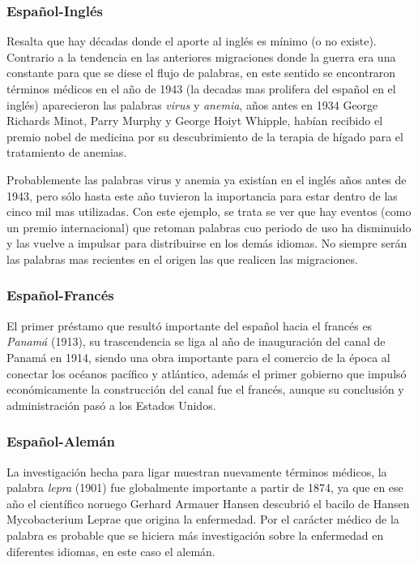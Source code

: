 \subsubsection*{Español-Inglés}%

Resalta que hay décadas donde el aporte al inglés es mínimo (o no existe). Contrario a la tendencia en las anteriores migraciones donde la guerra era una constante para que se diese el flujo de palabras, en este sentido se encontraron términos médicos en el año de 1943 (la decadas mas prolifera del español en el inglés) aparecieron las palabras \textit{virus} y \textit{anemia}, años antes en 1934 George Richards Minot, Parry Murphy y George Hoiyt Whipple, habían recibido el premio nobel de medicina por su descubrimiento de la terapia de hígado para el tratamiento de anemias.   

Probablemente las palabras virus y anemia ya existían en el inglés años antes de 1943,  pero sólo hasta este año tuvieron la importancia para estar dentro de las cinco mil mas utilizadas. Con este ejemplo, se trata se ver que hay eventos (como un premio internacional) que retoman palabras cuo periodo de uso  ha disminuido y las vuelve a impulsar para distribuirse en los demás idiomas.   No siempre serán las palabras mas recientes en el origen las que realicen las migraciones. 

\subsubsection*{Español-Francés}%

El primer préstamo que resultó importante del español hacia el francés es \textit{Panamá} (1913), su trascendencia se liga al año de inauguración del canal de Panamá en 1914, siendo una obra importante para el comercio de la época al conectar los océanos pacífico y atlántico, además el primer gobierno que impulsó económicamente la construcción del canal fue el francés,  aunque su conclusión y administración pasó a los Estados Unidos.  




\subsubsection*{Español-Alemán}%


La investigación hecha para ligar muestran nuevamente términos médicos, la palabra \textit{lepra} (1901) fue globalmente importante a partir de 1874,  ya que en ese año el científico noruego Gerhard Armauer Hansen descubrió el bacilo de Hansen Mycobacterium Leprae \cite{lepra} que origina la enfermedad. Por el carácter médico de la palabra es probable que se hiciera más investigación sobre la enfermedad en diferentes idiomas, en este caso el alemán.

